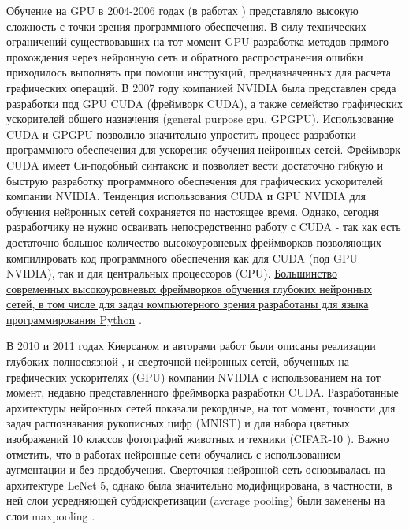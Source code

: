 \documentclass[12pt]{article}
\begin{document}
\begin{sloppypar}
Обучение на GPU в 2004-2006 годах (в работах \cite{oh2004gpu, steinkraus2005using, chellapilla2006high}) представляло высокую сложность с точки зрения программного обеспечения. В силу технических ограничений существовавших на тот момент GPU разработка методов прямого прохождения через нейронную сеть и обратного распространения ошибки приходилось выполнять при помощи инструкций, предназначенных для расчета графических операций. В 2007 году компанией NVIDIA была представлен среда разработки под GPU CUDA (фреймворк CUDA), а также семейство графических ускорителей общего назначения (general purpose gpu, GPGPU). Использование CUDA и GPGPU позволило значительно упростить процесс разработки программного обеспечения для ускорения обучения нейронных сетей. Фреймворк CUDA имеет Си-подобный синтаксис и позволяет вести достаточно гибкую и быструю разработку программного обеспечения для графических ускорителей компании NVIDIA. Тенденция использования CUDA и GPU NVIDIA для обучения нейронных сетей сохраняется по настоящее время. Однако, сегодня разработчику не нужно осваивать непосредственно работу с CUDA - так как есть достаточно большое количество высокоуровневых фреймворков позволяющих компилировать код программного обеспечения как для CUDA (под GPU NVIDIA), так и для центральных процессоров (CPU). \uline{Большинство современных высокоуровневых фреймворков обучения глубоких нейронных сетей, в том числе для задач компьютерного зрения разработаны для языка программирования Python} \cite{nguyen2019machine}.

В 2010 и 2011 годах Киерсаном и авторами работ \cite{cirecsan2010deep, ciresan2011flexible} были описаны реализации глубоких полносвязной \cite{cirecsan2010deep}, и сверточной \cite{ciresan2011flexible} нейронных сетей, обученных на графических ускорителях (GPU) компании NVIDIA с использованием на тот момент, недавно представленного фреймворка разработки CUDA. Разработанные архитектуры нейронных сетей \cite{cirecsan2010deep, ciresan2011flexible} показали рекордные, на тот момент, точности для задач распознавания рукописных цифр (MNIST) и для набора цветных изображений 10 классов фотографий животных и техники (CIFAR-10 \cite{CIFARKrizhevsky2010}). Важно отметить, что в работах \cite{cirecsan2010deep, ciresan2011flexible}  нейронные сети обучались с использованием аугментации и без предобучения. Сверточная нейронной сеть основывалась на архитектуре LeNet 5, однако была значительно модифицирована, в частности, в ней слои усредняющей субдискретизации (average pooling) были заменены на слои maxpooling \cite{ciresan2011flexible}. 


\end{sloppypar}
\end{document}

